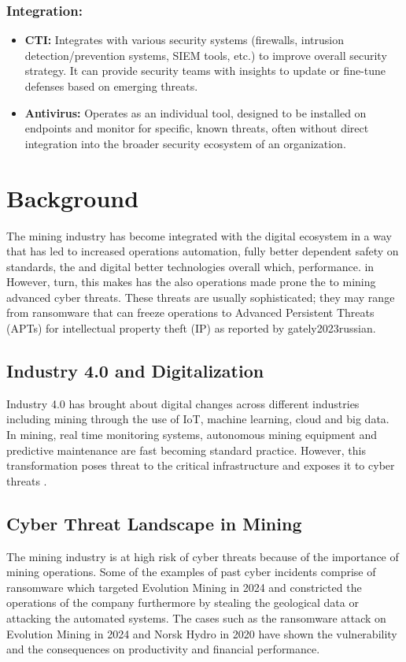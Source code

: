 \documentclass[a4paper,twoside,12pt]{report}
\begin{document}
\subsubsection{Integration:}
\begin{itemize}
    \item \textbf{CTI:} Integrates with various security systems (firewalls, intrusion detection/prevention systems, SIEM tools, etc.) to improve overall security strategy. It can provide security teams with insights to update or fine-tune defenses based on emerging threats.
    
    \item \textbf{Antivirus:} Operates as an individual tool, designed to be installed on endpoints and monitor for specific, known threats, often without direct integration into the broader security ecosystem of an organization.
\end{itemize}

\section{Background}
 
The mining industry has become integrated with the digital ecosystem in a way that has led to  increased operations automation, fully better dependent safety on standards, the and digital better technologies overall which, performance. in However, turn, this makes has the also operations made prone the to mining advanced  cyber  threats. These threats are usually sophisticated; they may range from ransomware that can freeze operations to Advanced Persistent  Threats (APTs) for intellectual property theft (IP) as reported by  gately2023russian. 

\subsection{Industry 4.0 and Digitalization} 
Industry  4.0 has brought about digital changes across different industries including mining through the use of IoT, machine  learning, cloud and big data. In mining, real time monitoring systems, autonomous mining equipment and predictive maintenance  are fast becoming standard practice. However, this transformation poses threat to the critical infrastructure and exposes it to  cyber threats \citep{wang2013cyber, sajid2016cloud}. 

 \subsection{Cyber Threat Landscape in Mining} 
The mining industry is at high risk of cyber threats  because of the importance of mining operations. Some of the examples of past cyber incidents comprise of ransomware  which targeted Evolution Mining in 2024 and constricted the operations of the company furthermore by stealing the  geological data or attacking the automated systems. The cases such as the ransomware attack on Evolution Mining in  2024 and Norsk Hydro in 2020 have shown the vulnerability and the consequences on productivity  and financial performance. 
\end{document}
